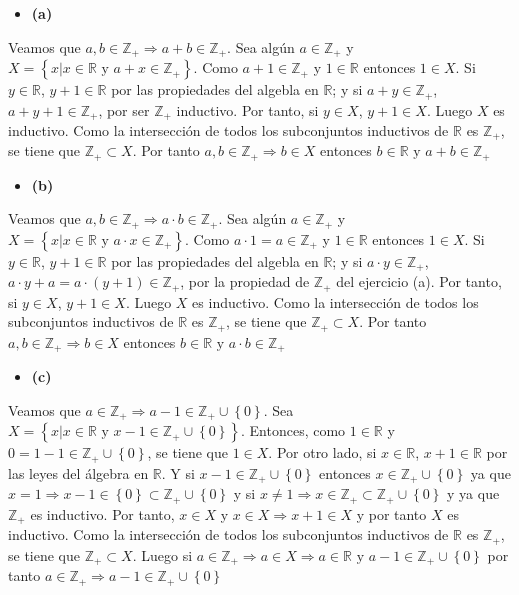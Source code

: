 \documentclass{article}
\begin{document}
\begin{itemize} 
\item \bf (a) \rm 
\end{itemize}
Veamos que \(a,b\in\mathbb{Z}_{+}\Rightarrow a+b\in\mathbb{Z}_{+}\). Sea algún \(a\in\mathbb{Z}_{+}\) y \(X=\left\{x|x\in\mathbb{R}\text{ y }a+x\in\mathbb{Z}_{+}\right\}\). Como \(a+1\in\mathbb{Z}_{+}\) y \(1\in\mathbb{R}\) entonces \(1\in X\). Si \(y\in \mathbb{R}\), \(y+1\in \mathbb{R}\) por las propiedades del algebla en \(\mathbb{R}\); y si \(a+y\in\mathbb{Z}_{+}\), \(a+y+1\in\mathbb{Z}_{+}\), por ser \(\mathbb{Z}_{+}\) inductivo. Por tanto, si \(y\in X\), \(y+1\in X\). Luego \(X\) es inductivo. Como la intersección de todos los subconjuntos inductivos de \(\mathbb{R}\) es \(\mathbb{Z}_{+}\), se tiene que \(\mathbb{Z}_{+}\subset X\). Por tanto \(a,b\in\mathbb{Z}_{+} \Rightarrow b\in X\) entonces \( b\in\mathbb{R} \text{ y }a+b\in\mathbb{Z}_{+}\)
\begin{itemize} 
\item \bf (b) \rm 
\end{itemize}
Veamos que \(a,b\in\mathbb{Z}_{+}\Rightarrow a\cdot b\in\mathbb{Z}_{+}\). Sea algún \(a\in\mathbb{Z}_{+}\) y \(X=\left\{x|x\in\mathbb{R}\text{ y }a\cdot x\in\mathbb{Z}_{+}\right\}\). Como \(a\cdot 1=a\in\mathbb{Z}_{+}\) y \(1\in\mathbb{R}\) entonces \(1\in X\). Si \(y\in \mathbb{R}\), \(y+1\in \mathbb{R}\) por las propiedades del algebla en \(\mathbb{R}\); y si \(a\cdot y\in\mathbb{Z}_{+}\), \(a\cdot y+a= a\cdot \left(y+1\right)\in\mathbb{Z}_{+}\), por la propiedad de \(\mathbb{Z}_{+}\) del ejercicio (a). Por tanto, si \(y\in X\), \(y+1\in X\). Luego \(X\) es inductivo. Como la intersección de todos los subconjuntos inductivos de \(\mathbb{R}\) es \(\mathbb{Z}_{+}\), se tiene que \(\mathbb{Z}_{+}\subset X\). Por tanto \(a,b\in\mathbb{Z}_{+} \Rightarrow  b\in X\) entonces \( b\in\mathbb{R} \text{ y }a\cdot b\in\mathbb{Z}_{+}\)
\begin{itemize} 
\item \bf (c) \rm 
\end{itemize}
Veamos que \(a\in \mathbb{Z}_{+} \Rightarrow a-1\in \mathbb{Z}_{+}\cup \left\{0\right\}\). Sea \(X=\left\{x|x\in \mathbb{R}\text{ y } x-1\in \mathbb{Z}_{+}\cup \left\{0\right\}\right\}\). Entonces, como \(1\in \mathbb{R}\) y \(0=1-1\in \mathbb{Z}_{+}\cup \left\{0\right\}\), se tiene que \(1\in X\). Por otro lado, si \(x\in \mathbb{R}\), \(x+1\in \mathbb{R}\) por las leyes del álgebra en \(\mathbb{R}\). Y si \(x-1\in \mathbb{Z}_{+}\cup \left\{0\right\}\) entonces \(x\in\mathbb{Z}_{+}\cup \left\{0\right\}\) ya que \(x=1 \Rightarrow x-1\in \left\{0\right\}\subset\mathbb{Z}_{+}\cup \left\{0\right\}\) y si \(x\neq 1 \Rightarrow x \in\mathbb{Z}_{+}\subset\mathbb{Z}_{+}\cup \left\{0\right\} \) y ya que \(\mathbb{Z}_{+}\) es inductivo. Por tanto, \(x\in X\) y \(x\in X \Rightarrow x+1\in X\) y por tanto \(X\) es inductivo.  Como la intersección de todos los subconjuntos inductivos de \(\mathbb{R}\) es \(\mathbb{Z}_{+}\), se tiene que \(\mathbb{Z}_{+}\subset X\). Luego si \(a\in \mathbb{Z}_{+}\Rightarrow a\in X \Rightarrow a\in \mathbb{R} \text{ y } a-1\in \mathbb{Z}_{+}\cup \left\{0\right\}\) por tanto \(a\in \mathbb{Z}_{+}\Rightarrow a-1\in \mathbb{Z}_{+}\cup \left\{0\right\}\)
\end{document}
